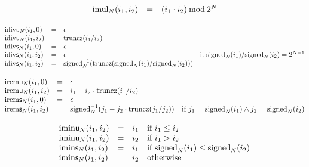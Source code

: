 $$
\begin{array}[t]{@{}lcl@{}l@{}}
{{\mathrm{imul}}}_{N}(i_1, i_2) & = & (i_1 \cdot i_2) \mathbin{\mathrm{mod}} {2^{N}} \\
\end{array}
$$

$$
\begin{array}[t]{@{}lcl@{}l@{}}
{{\mathrm{idiv}}}{\mathsf{u}}{{}_{N}(i_1, 0)} & = & \epsilon \\
{{\mathrm{idiv}}}{\mathsf{u}}{{}_{N}(i_1, i_2)} & = & {\mathrm{truncz}}(i_1 / i_2) \\
{{\mathrm{idiv}}}{\mathsf{s}}{{}_{N}(i_1, 0)} & = & \epsilon \\
{{\mathrm{idiv}}}{\mathsf{s}}{{}_{N}(i_1, i_2)} & = & \epsilon & \quad \mbox{if}~ {{\mathrm{signed}}}_{N}(i_1) / {{\mathrm{signed}}}_{N}(i_2) = {2^{N - 1}} \\
{{\mathrm{idiv}}}{\mathsf{s}}{{}_{N}(i_1, i_2)} & = & {{{{\mathrm{signed}}}_{N}^{{-1}}}}{({\mathrm{truncz}}({{\mathrm{signed}}}_{N}(i_1) / {{\mathrm{signed}}}_{N}(i_2)))} \\
\end{array}
$$

$$
\begin{array}[t]{@{}lcl@{}l@{}}
{{\mathrm{irem}}}{\mathsf{u}}{{}_{N}(i_1, 0)} & = & \epsilon \\
{{\mathrm{irem}}}{\mathsf{u}}{{}_{N}(i_1, i_2)} & = & i_1 - i_2 \cdot {\mathrm{truncz}}(i_1 / i_2) \\
{{\mathrm{irem}}}{\mathsf{s}}{{}_{N}(i_1, 0)} & = & \epsilon \\
{{\mathrm{irem}}}{\mathsf{s}}{{}_{N}(i_1, i_2)} & = & {{{{\mathrm{signed}}}_{N}^{{-1}}}}{(j_1 - j_2 \cdot {\mathrm{truncz}}(j_1 / j_2))} & \quad \mbox{if}~ j_1 = {{\mathrm{signed}}}_{N}(i_1) \land j_2 = {{\mathrm{signed}}}_{N}(i_2) \\
\end{array}
$$

$$
\begin{array}[t]{@{}lcl@{}l@{}}
{{\mathrm{imin}}}{\mathsf{u}}{{}_{N}(i_1, i_2)} & = & i_1 & \quad \mbox{if}~ i_1 \leq i_2 \\
{{\mathrm{imin}}}{\mathsf{u}}{{}_{N}(i_1, i_2)} & = & i_2 & \quad \mbox{if}~ i_1 > i_2 \\
{{\mathrm{imin}}}{\mathsf{s}}{{}_{N}(i_1, i_2)} & = & i_1 & \quad \mbox{if}~ {{\mathrm{signed}}}_{N}(i_1) \leq {{\mathrm{signed}}}_{N}(i_2) \\
{{\mathrm{imin}}}{\mathsf{s}}{{}_{N}(i_1, i_2)} & = & i_2 & \quad \mbox{otherwise} \\
\end{array}
$$

